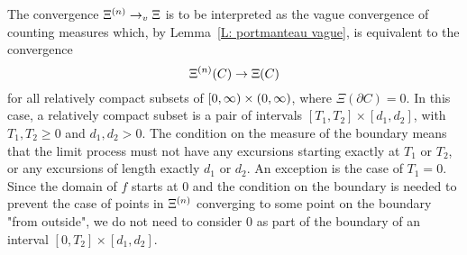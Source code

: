 \begin{note}
	The convergence
	$\Xi^{(n)} \rightarrow_v \Xi$
	is to be interpreted as the vague convergence of counting measures
	which, by Lemma~\ref{L: portmanteau vague},
	is equivalent to the convergence
	\begin{equation}
	\Xi^{(n)}(C) \rightarrow \Xi(C)
	\end{equation}
	for all relatively compact subsets of
	$[0, \infty) \times (0, \infty)$,
	where $\Xi(\partial C) = 0$.
	In this case, a relatively compact subset is a pair of intervals
	$[T_1, T_2] \times [d_1, d_2]$,
	with $T_1, T_2 \geq 0$
	and $d_1, d_2 > 0$.
	The condition on the measure of the boundary means
	that the limit process must not have any excursions starting exactly at
	$T_1$ or $T_2$,
	or any excursions of length exactly $d_1$ or $d_2$.
	An exception is the case of $T_1=0$.
	Since the domain of $f$ starts at $0$
	and the condition on the boundary is needed to prevent the case of points in $\Xi^{(n)}$ converging to some point on the boundary "from outside",
	we do not need to consider $0$ as part of the boundary of an interval 
	$[0, T_2] \times [d_1, d_2]$.
\end{note}


